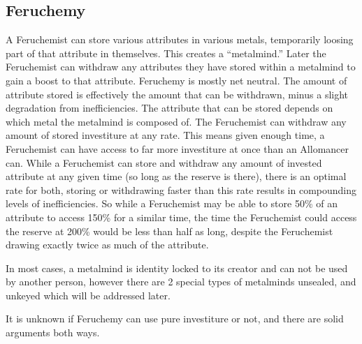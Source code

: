 \documentclass[conference]{IEEEtran}
\begin{document}
\subsection*{\textbf{Feruchemy}}
A Feruchemist can store various attributes in various metals, temporarily loosing part of that attribute in themselves.\cite{TFE-CH22}   This creates a ``metalmind.''  Later the Feruchemist can withdraw any attributes they have stored within a metalmind to gain a boost to that attribute.  Feruchemy is mostly net neutral.  The amount of attribute stored is effectively the amount that can be withdrawn, minus a slight degradation from inefficiencies.  The attribute that can be stored depends on which metal the metalmind is composed of.\cite{TFE-CH22}  The Feruchemist can withdraw any amount of stored investiture at any rate.  This means given enough time, a Feruchemist can have access to far more investiture at once than an Allomancer can.\cite{TFE-CH27}
While a Feruchemist can store and withdraw any amount of invested attribute at any given time (so long as the reserve is there), there is an optimal rate for both, storing or withdrawing faster than this rate results in compounding levels of inefficiencies.  So while a Feruchemist may be able to store 50\% of an attribute to access 150\% for a similar time, the time the Feruchemist could access the reserve at 200\% would be less than half as long, despite the Feruchemist drawing exactly twice as much of the attribute.\cite{fe-decay}

In most cases, a metalmind is identity locked to its creator and can not be used by another person, however there are 2 special types of metalminds unsealed, and unkeyed which will be addressed later.\cite{BoM-CH3} 

It is unknown if Feruchemy can use pure investiture or not, and there are solid arguments both ways.
\end{document}
